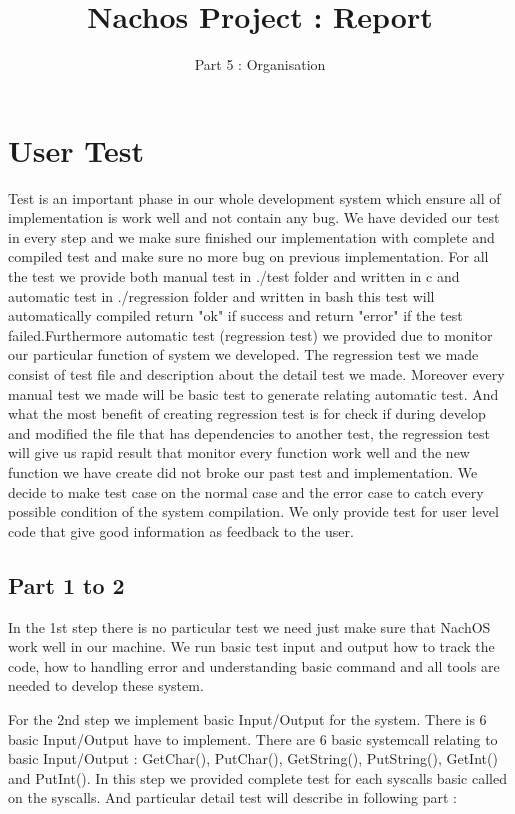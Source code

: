 \documentclass[a4paper,10pt]{article}
\title{Nachos Project : Report}
\subtitle{Part 5 : Organisation}
\begin{document}
\maketitle

\section{User Test}

Test is an important phase in our whole development system which ensure all of implementation is work well and 
not contain any bug. We have devided our test in every step and we make sure finished our implementation with 
complete and compiled test and make sure no more bug on previous implementation. For all the test we provide
both manual test in ./test folder and written in c and automatic test in ./regression folder and written in bash 
this test will automatically compiled return "ok" if success and return "error" if the test failed.Furthermore 
automatic test (regression test) we provided due to monitor our particular function of system we developed.
The regression test we made consist of test file and description about the detail test we made. Moreover
every manual test we made will be basic test to generate relating automatic test. And what 
the most benefit of creating regression test is for check if during develop and modified the file that has 
dependencies to another test, the regression test will give us rapid result that monitor every function work well
and the new function we have create did not broke our past test and implementation. We decide to make test case 
on the normal case and the error case to catch every possible condition of the system compilation. We only provide
test for user level code that give good information as feedback to the user. 


\subsection{Part 1 to 2}

In the 1st step there is no particular test we need just make sure that NachOS work well in our machine. We run 
basic test input and output how to track the code, how to handling error and understanding basic command and all 
tools are needed to develop these system. 

For the 2nd step we implement basic Input/Output for the system. There is 6 basic Input/Output have to implement.
There are 6 basic systemcall relating to basic Input/Output : GetChar(), PutChar(), GetString(), PutString(), 
GetInt() and PutInt(). In this step we provided complete test for each syscalls basic called on the syscalls. And 
particular detail test will describe in following part :
\end{document}
